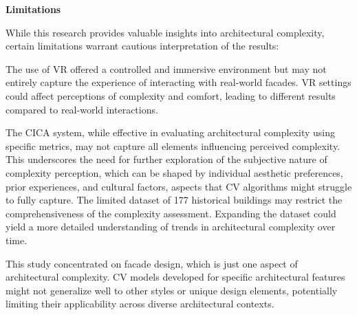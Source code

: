\textbf{Limitations}

While this research provides valuable insights into architectural complexity, certain limitations warrant cautious interpretation of the results:



The use of VR offered a controlled and immersive environment but may not entirely capture the experience of interacting with real-world facades.
VR settings could affect perceptions of complexity and comfort, leading to different results compared to real-world interactions.

The CICA system, while effective in evaluating architectural complexity using specific metrics, may not capture all elements influencing perceived complexity.
This underscores the need for further exploration of the subjective nature of complexity perception, which can be shaped by individual aesthetic preferences, prior experiences, and cultural factors, aspects that CV algorithms might struggle to fully capture.
The limited dataset of 177 historical buildings may restrict the comprehensiveness of the complexity assessment.
Expanding the dataset could yield a more detailed understanding of trends in architectural complexity over time.

This study concentrated on facade design, which is just one aspect of architectural complexity.
CV models developed for specific architectural features might not generalize well to other styles or unique design elements, potentially limiting their applicability across diverse architectural contexts.


